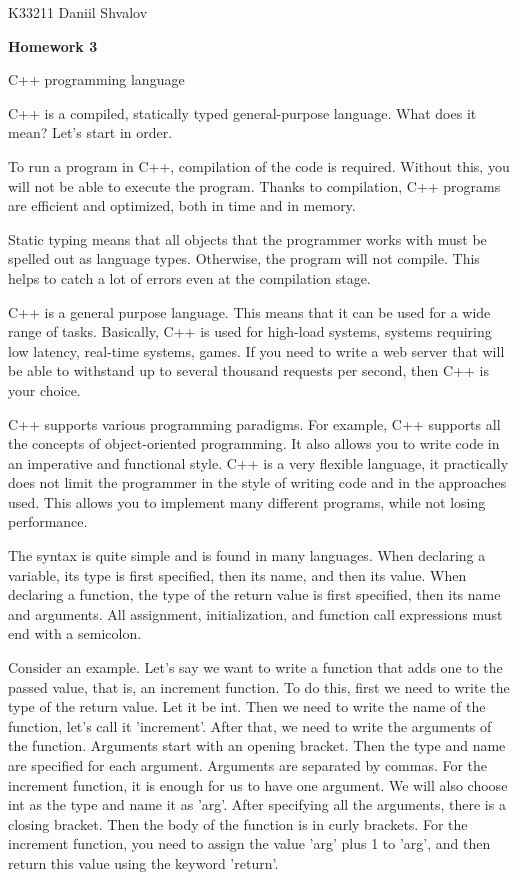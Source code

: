\documentclass[a4paper, 14pt]{extarticle}
\begin{document}
\begin{flushright}
  K33211 Daniil Shvalov
\end{flushright}

\begin{center}
  \textbf{Homework 3}

  C++ programming language
\end{center}

C++ is a compiled, statically typed general-purpose language. What does it mean?
Let's start in order.

To run a program in C++, compilation of the code is required. Without this, you
will not be able to execute the program. Thanks to compilation, C++ programs are
efficient and optimized, both in time and in memory.

Static typing means that all objects that the programmer works with must be
spelled out as language types. Otherwise, the program will not compile. This
helps to catch a lot of errors even at the compilation stage.

C++ is a general purpose language. This means that it can be used for a wide
range of tasks. Basically, C++ is used for high-load systems, systems requiring
low latency, real-time systems, games. If you need to write a web server that
will be able to withstand up to several thousand requests per second, then C++
is your choice.

C++ supports various programming paradigms. For example, C++ supports all the
concepts of object-oriented programming. It also allows you to write code in an
imperative and functional style. C++ is a very flexible language, it practically
does not limit the programmer in the style of writing code and in the approaches
used. This allows you to implement many different programs, while not losing
performance.

The syntax is quite simple and is found in many languages. When declaring a
variable, its type is first specified, then its name, and then its value. When
declaring a function, the type of the return value is first specified, then its
name and arguments. All assignment, initialization, and function call
expressions must end with a semicolon.

Consider an example. Let's say we want to write a function that adds one to
the passed value, that is, an increment function. To do this, first we need to
write the type of the return value. Let it be int. Then we need to write the
name of the function, let's call it 'increment'. After that, we need to write
the arguments of the function. Arguments start with an opening bracket. Then the
type and name are specified for each argument. Arguments are separated by
commas. For the increment function, it is enough for us to have one argument.
We will also choose int as the type and name it as 'arg'. After specifying all
the arguments, there is a closing bracket. Then the body of the function is in
curly brackets. For the increment function, you need to assign the value 'arg'
plus 1 to 'arg', and then return this value using the keyword 'return'.
\end{document}
